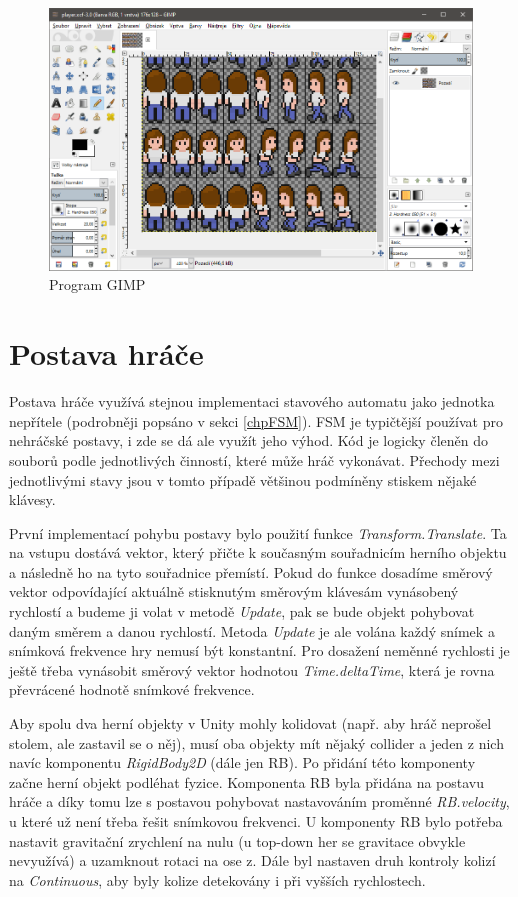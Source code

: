 \documentclass[FM,Proj]{tulthesis}
\begin{document}
	\begin{figure}[ht]
		\centering
		\includegraphics[width=\textwidth]{img/GIMP}
		\caption{Program GIMP}		
	\end{figure}
	
	\section{Postava hráče} %
	
	Postava hráče využívá stejnou implementaci stavového automatu jako jednotka nepřítele (podrobněji popsáno v sekci \ref{chpFSM}). FSM je typičtější používat pro nehráčské postavy, i zde se dá ale využít jeho výhod. Kód je logicky členěn do souborů podle jednotlivých činností, které může hráč vykonávat. Přechody mezi jednotlivými stavy jsou v tomto případě většinou podmíněny stiskem nějaké klávesy.
	
	První implementací pohybu postavy bylo použití funkce \textit{Transform.Translate}. Ta na vstupu dostává vektor, který přičte k současným souřadnicím herního objektu a následně ho na tyto souřadnice přemístí. Pokud do funkce dosadíme směrový vektor odpovídající aktuálně stisknutým směrovým klávesám vynásobený rychlostí a budeme ji volat v metodě \textit{Update}, pak se bude objekt pohybovat daným směrem a danou rychlostí. Metoda \textit{Update} je ale volána každý snímek a snímková frekvence hry nemusí být konstantní. Pro dosažení neměnné rychlosti je ještě třeba vynásobit směrový vektor hodnotou \textit{Time.deltaTime}, která je rovna převrácené hodnotě snímkové frekvence.
	
	Aby spolu dva herní objekty v Unity mohly kolidovat (např. aby hráč neprošel stolem, ale zastavil se o něj), musí oba objekty mít nějaký collider a jeden z nich navíc komponentu \textit{RigidBody2D} (dále jen RB). Po přidání této komponenty začne herní objekt podléhat fyzice. Komponenta RB byla přidána na postavu hráče a díky tomu lze s postavou pohybovat nastavováním proměnné \textit{RB.velocity}, u které už není třeba řešit snímkovou frekvenci. U komponenty RB bylo potřeba nastavit gravitační zrychlení na nulu (u top-down her se gravitace obvykle nevyužívá) a uzamknout rotaci na ose z. Dále byl nastaven druh kontroly kolizí na \textit{Continuous}, aby byly kolize detekovány i při vyšších rychlostech.
	
\end{document}
